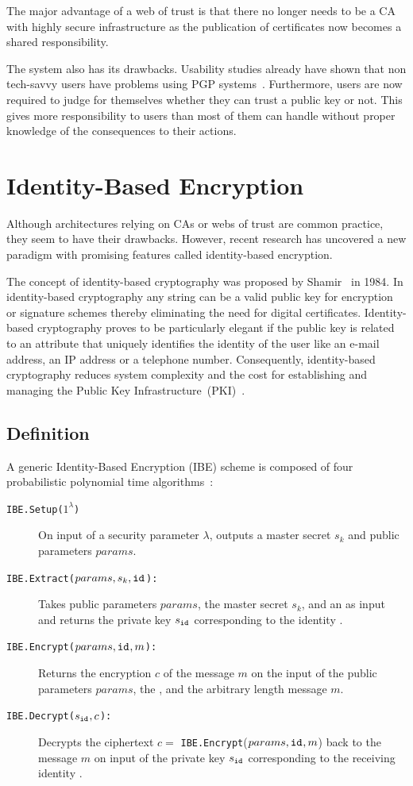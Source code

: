 The major advantage of a web of trust is that there no longer needs to be a CA with highly secure infrastructure as the publication of certificates now becomes a shared responsibility.

The system also has its drawbacks. Usability studies already have shown that non tech-savvy users have problems using PGP systems~\cite{art:WhittenT99}. Furthermore, users are now required to judge for themselves whether they can trust a public key or not. This gives more responsibility to users than most of them can handle without proper knowledge of the consequences to their actions.

\section{Identity-Based Encryption}
Although architectures relying on CAs or webs of trust are common practice, they seem to have their drawbacks. However, recent research has uncovered a new paradigm with promising features called identity-based encryption.

The concept of identity-based cryptography was proposed by Shamir~\cite{art:Shamir84} in 1984. In identity-based cryptography any string can be a valid public key for encryption or signature schemes thereby eliminating the need for digital certificates. Identity-based cryptography proves to be particularly elegant if the public key is related to an attribute that uniquely identifies the identity of the user like an e-mail address, an IP address or a telephone number. Consequently, identity-based cryptography reduces system complexity and the cost for establishing and managing the Public Key Infrastructure~(PKI)~\cite{art:BaekNSS04}. 


\subsection{Definition}
A generic Identity-Based Encryption (IBE) scheme is composed of four probabilistic polynomial time algorithms~\cite{art:BonehF01}:
\begin{description}
    \item[\texttt{IBE.Setup($1^{\lambda}$)}] On input of a security parameter $\lambda$, outputs a master secret $s_k$ and public parameters $params$.
    \item[\texttt{IBE.Extract($params, s_k, \mathtt{id}_{}$):}] Takes public parameters $params$, the master secret $s_k$, and an \id{} as input and returns the private key $s_{\mathtt{id}_{}}$ corresponding to the identity \id{}.
    \item[\texttt{IBE.Encrypt($params, \mathtt{id}_{}, m$):}] Returns the encryption $c$ of the message $m$ on the input of the public parameters $params$, the \id{}, and the arbitrary length message $m$.
    \item[\texttt{IBE.Decrypt($s_{\mathtt{id}_{}}, c$):}] Decrypts the ciphertext $c =$ \texttt{IBE.Encrypt}($params, \mathtt{id}_{}, m$) back to the message $m$ on input of the private key $s_{\mathtt{id}_{}}$ corresponding to the receiving identity \id{}.
\end{description}

